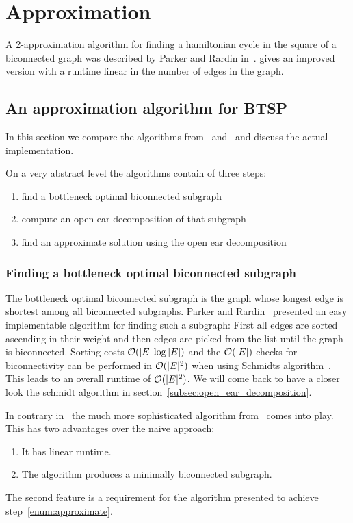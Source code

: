 \chapter{Approximation}

A 2-approximation algorithm for finding a hamiltonian cycle in the square of a biconnected graph was described by Parker and Rardin in~\cite{ParkerRardin1984}. \cite{alstrup2018hamiltonian} gives an improved version with a runtime linear in the number of edges in the graph.

\section{An approximation algorithm for BTSP}
In this section we compare the algorithms from~\cite{ParkerRardin1984} and~\cite{alstrup2018hamiltonian} and discuss the actual implementation.

On a very abstract level the algorithms contain of three steps:
\begin{enumerate}
  \item find a bottleneck optimal biconnected subgraph
  \item compute an open ear decomposition of that subgraph
  \item find an approximate solution using the open ear decomposition\label{enum:approximate}
\end{enumerate}

\subsection{Finding a bottleneck optimal biconnected subgraph}
The bottleneck optimal biconnected subgraph is the graph whose longest edge is shortest among all biconnected subgraphs.
Parker and Rardin~\cite{ParkerRardin1984} presented an easy implementable algorithm for finding such a subgraph: First all edges are sorted ascending in their weight and then edges are picked from the list until the graph is biconnected. Sorting costs \(\mathcal{O}(\vert E \vert \log \vert E \vert)\) and the \(\mathcal{O}(\vert E \vert)\) checks for biconnectivity can be performed in \(\mathcal{O}(\vert E \vert^2)\) when using Schmidts algorithm~\cite{schmidt2013}. This leads to an overall runtime of \(\mathcal{O}(\vert E \vert^2)\). We will come back to have a closer look the schmidt algorithm in section~\ref{subsec:open_ear_decomposition}.

In contrary in~\cite{alstrup2018hamiltonian} the much more sophisticated algorithm from~\cite{han1995} comes into play. This has two advantages over the naive approach:
\begin{enumerate}
  \item It has linear runtime.
  \item The algorithm produces a minimally biconnected subgraph.
\end{enumerate}
The second feature is a requirement for the algorithm presented to achieve step~\ref{enum:approximate}.

